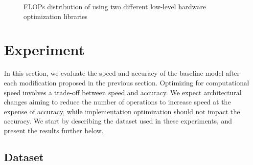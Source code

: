 \documentclass[runningheads]{llncs}
\begin{document}
\begin{figure}[h]
\centering
{}%
%

\centering
\caption{FLOPs distribution of using two different low-level hardware optimization libraries}
\end{figure}


\section{Experiment}



In this section, we evaluate the speed and accuracy of the baseline model after each modification proposed in the previous section.
Optimizing for computational speed involves a trade-off between speed and accuracy.
We expect architectural changes aiming to reduce the number of operations to increase speed at the expense of accuracy,
while implementation optimization should not impact the accuracy.
We start by describing the dataset used in these experiments, and present the results further below.

\subsection{Dataset}
\end{document}
